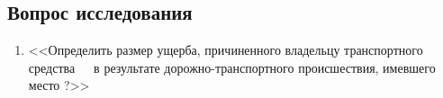 \subsection{Вопрос исследования}
\begin{enumerate}
\item <<Определить размер ущерба, причиненного владельцу  транспортного средства \tc\,\, \, в результате дорожно-транспортного происшествия, имевшего место ?>>
\end{enumerate}